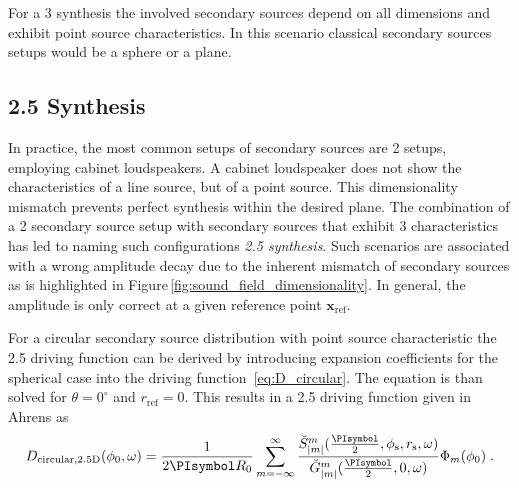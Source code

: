 \documentclass[a4paper]{book}
\newcommand{\reproduce}[1]{%
    \href{#1}{\color{link}\large\Pointinghand}%
}%
\newcommand{\PI}{\PIsymbol}%
\newcommand{\degree}{^\circ}                         %
\renewcommand{\vec}[1]{\mathbf{#1}}                  %
\newcommand{\x}{\vec{x}}                             %
\newcommand{\qp}{\;.}                                             %
\def \twoD {{2\text{D}}\xspace}                                   %
\def \twohalfD {{2.5\text{D}}\xspace}                             %
\def \threeD {{3\text{D}}\xspace}                                 %
\begin{document}
{For a \threeD synthesis the involved secondary sources depend on all dimensions
and exhibit point source characteristics. In this scenario
classical secondary sources setups would be a sphere or a plane.

\subsection{\twohalfD Synthesis}
\label{sec:25d_synthesis}
%
%
In practice, the most common setups of secondary sources are \twoD setups,
employing cabinet loudspeakers. A cabinet loudspeaker does not show the characteristics
of a line source, but of a point source. This dimensionality mismatch prevents perfect
synthesis within the desired plane. The combination of a \twoD secondary source
setup with secondary
sources that exhibit \threeD characteristics has led to naming such
configurations
\emph{\twohalfD synthesis}.\cite{Start1997} Such scenarios
are associated with a wrong amplitude decay due to the inherent mismatch of secondary
sources as is highlighted in Figure\,\ref{fig:sound_field_dimensionality}.
In general, the amplitude is only correct at a given reference point
$\x_\text{ref}$.

For a circular secondary source distribution with point source characteristic
the \twohalfD driving function
can be derived by introducing expansion coefficients for the spherical case
into the driving function~\eqref{eq:D_circular}. The equation is than solved
for $\theta = 0\degree$ and $r_\text{ref} = 0$. This
results in a \twohalfD driving function given in
Ahrens\cite[][(3.49)]{Ahrens2012} as
%
\begin{equation}
    D_{\text{circular},\twohalfD}(\phi_0,\omega) = \frac{1}{2\PI R_0} \sum_{m=-\infty}^\infty
    \frac{\breve{S}_{|m|}^m (\frac{\PI}{2},\phi_\text{s},r_\text{s},\omega)}{\breve{G}_{|m|}^m
    (\frac{\PI}{2},0,\omega)}
    \Phi_m(\phi_0) \qp
    \label{eq:D_circular_25D}
\end{equation}
%

}
\end{document}
